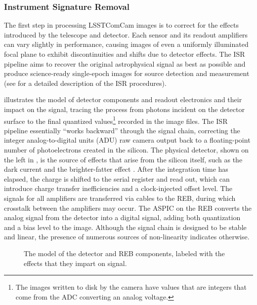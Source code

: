 \subsubsection{Instrument Signature Removal}
\label{ssec:isr}
The first step in processing \gls{LSSTComCam} images is to correct for the effects introduced by the telescope and detector.
Each sensor and its readout amplifiers can vary slightly in performance, causing images of even a uniformly illuminated focal plane to exhibit discontinuities and shifts due to detector effects.
The \gls{ISR} pipeline aims to recover the original astrophysical signal as best as possible and produce science-ready single-epoch images for source detection and measurement (see \citealt{SITCOMTN-086,2025JATIS..11a1209P} for a detailed description of the \gls{ISR} procedures).

 illustrates the model of detector components and readout electronics and their impact on the signal, tracing the process from photons incident on the detector surface to the final quantized values\footnote{The images written to disk by the camera have values that are integers that come from the ADC converting an analog voltage.} recorded in the image files.
The \gls{ISR} \gls{pipeline} essentially ``works backward'' through the signal chain, correcting the integer analog-to-digital units (ADU) raw camera output back to a floating-point number of photoelectrons created in the silicon.
The physical detector, shown on the left in  , is the source of effects that arise from the silicon itself, such as the dark current and the brighter-fatter effect \citep{doi:10.1088/1538-3873/aab820,2024PASP..136d5003B}.
After the integration time has elapsed, the charge is shifted  to the serial register and read out, which can introduce charge transfer inefficiencies and a clock-injected offset level.
The signals for all amplifiers are transferred via cables to the \gls{REB}, during which crosstalk between the amplifiers may occur.
The \gls{ASPIC} on the \gls{REB} converts the analog signal from the detector into a digital signal, adding both quantization and a bias level to the image.
Although the signal chain is designed to be stable and linear, the presence of numerous sources of non-linearity indicates otherwise.
\begin{figure}[htb]
  \centering
  \caption{The model of the detector and REB components, labeled with the effects that they impart on signal.}
  \label{fig:isr_signal_chain}
\end{figure}


